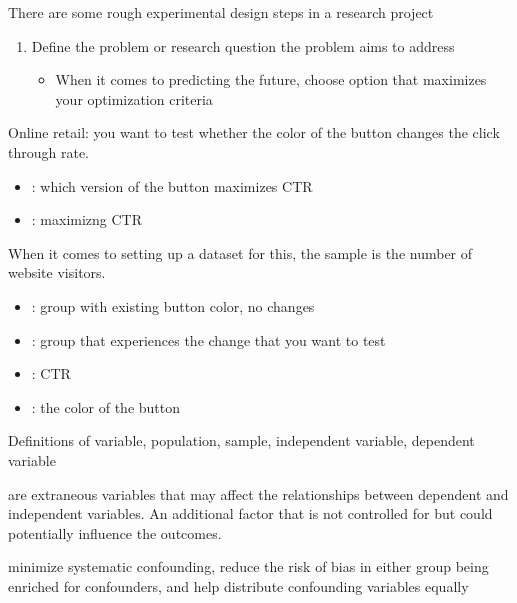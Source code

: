 \documentclass[12pt]{scrartcl}
\begin{document}
There are some rough experimental design steps in a research project

\begin{enumerate}
  \item Define the problem or research question the problem aims to address
  \begin{itemize}
    \item When it comes to predicting the future, choose option that maximizes your optimization criteria
  \end{itemize} 
\end{enumerate}

\begin{example}
  Online retail: you want to test whether the color of the button changes the click through rate. 
  \begin{itemize}
    \item {}: which version of the button maximizes CTR
    \item {}: maximizng CTR
  \end{itemize}

  When it comes to setting up a dataset for this, the sample is the number of website visitors. 
  \begin{itemize}
    \item {}: group with existing button color, no changes
    \item {}: group that experiences the change that you want to test
    \item {}: CTR
    \item {}: the color of the button
  \end{itemize}
\end{example}

Definitions of variable, population, sample, independent variable, dependent variable

\begin{definition}
   are extraneous variables that may affect the 
  relationships between dependent and independent variables. An additional factor 
  that is not controlled for but could potentially influence the outcomes.
\end{definition}

\begin{definition}
   minimize systematic confounding, reduce the risk of bias 
  in either group being enriched for confounders, and help distribute confounding 
  variables equally
\end{definition}
\end{document}
